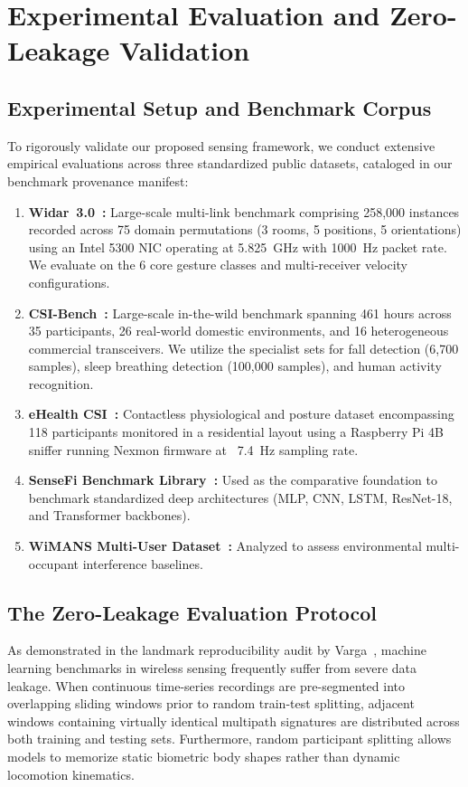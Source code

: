 \chapter{Experimental Evaluation and Zero-Leakage Validation}

\section{Experimental Setup and Benchmark Corpus}
To rigorously validate our proposed sensing framework, we conduct extensive empirical evaluations across three standardized public datasets, cataloged in our benchmark provenance manifest:
\begin{enumerate}
    \item \textbf{Widar~3.0~\cite{author2019zeroeffort}:} Large-scale multi-link benchmark comprising 258,000 instances recorded across 75 domain permutations (3 rooms, 5 positions, 5 orientations) using an Intel 5300 NIC operating at 5.825~GHz with 1000~Hz packet rate. We evaluate on the 6 core gesture classes and multi-receiver velocity configurations.
    \item \textbf{CSI-Bench~\cite{csi2025csi}:} Large-scale in-the-wild benchmark spanning 461 hours across 35 participants, 26 real-world domestic environments, and 16 heterogeneous commercial transceivers. We utilize the specialist sets for fall detection (6,700 samples), sleep breathing detection (100,000 samples), and human activity recognition.
    \item \textbf{eHealth CSI~\cite{author2025pulsefi}:} Contactless physiological and posture dataset encompassing 118 participants monitored in a residential layout using a Raspberry Pi 4B sniffer running Nexmon firmware at ~7.4~Hz sampling rate.
    \item \textbf{SenseFi Benchmark Library~\cite{yang2022sensefi}:} Used as the comparative foundation to benchmark standardized deep architectures (MLP, CNN, LSTM, ResNet-18, and Transformer backbones).
    \item \textbf{WiMANS Multi-User Dataset~\cite{author2024wimans}:} Analyzed to assess environmental multi-occupant interference baselines.
\end{enumerate}

\section{The Zero-Leakage Evaluation Protocol}
As demonstrated in the landmark reproducibility audit by Varga~\cite{author2024mitigating}, machine learning benchmarks in wireless sensing frequently suffer from severe data leakage. When continuous time-series recordings are pre-segmented into overlapping sliding windows prior to random train-test splitting, adjacent windows containing virtually identical multipath signatures are distributed across both training and testing sets. Furthermore, random participant splitting allows models to memorize static biometric body shapes rather than dynamic locomotion kinematics.

